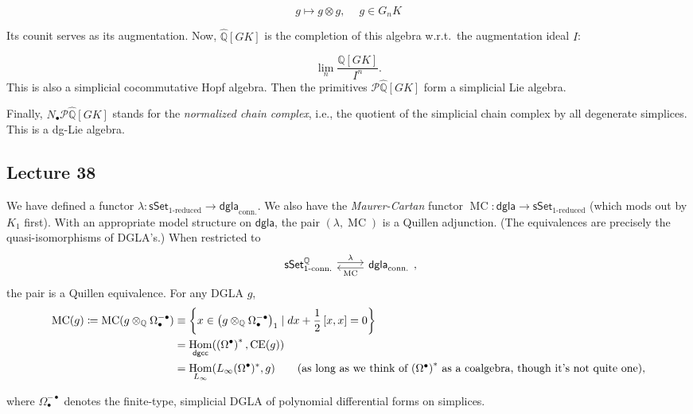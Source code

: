 \documentclass[10pt,letterpaper,cm]{nupset}
\theoremstyle{definition}
\theoremstyle{theorem}
\theoremstyle{remark}
\renewcommand{\P}{\mathcal P}
\newcommand{\Q}{\mathbb Q}
\newcommand{\1}{\mathbb{1}}
\newcommand{\0}{\vec 0}
\DeclareMathOperator{\Hom}{Hom}
\DeclareMathOperator{\mc}{MC}
\DeclareMathOperator{\ce}{CE}
\begin{document}
\[
g \mapsto g \otimes g, \ \quad g \in G_n{K}
\]

Its counit serves as its augmentation. Now, $\hat{\Q}\left[G{K}\right]$ is the completion of this algebra w.r.t.\ the augmentation ideal $I$:

\[
\lim_n\frac{\Q\left[G{K}\right]}{I^n}
.\] 
This is also a simplicial cocommutative Hopf algebra. Then the primitives $\P{\hat{\Q}\left[G{K}\right]}$ form a simplicial Lie algebra. 

\medskip

Finally,  $N_{\bullet}{\P{\hat{\Q}\left[G{K}\right]}}$ stands for the \textit{normalized chain complex}, i.e., the quotient of the simplicial chain complex by all degenerate simplices. This is a dg-Lie algebra. 

\subsection{Lecture 38}

We have defined a functor $\lambda : \mathsf{sSet}_{\text{$1$-reduced}} \to \mathsf{dgla}_{\text{conn.}}$. We also have the \textit{Maurer-Cartan} functor  \linebreak $\mc : \mathsf{dgla} \to \mathsf{sSet}_{\text{$1$-reduced}}$ (which mods out by $K_1$  first). With an appropriate model structure on $\mathsf{dgla}$, the pair $\left(\lambda, \mc\right)$ is a Quillen adjunction. (The equivalences are precisely the quasi-isomorphisms of DGLA's.) When restricted to 
\[
\begin{tikzcd}
	{\mathsf{sSet}_{\text{$1$-conn.}}^{\Q}} & {\mathsf{dgla}_{\text{conn.}}}
	\arrow["\lambda", shift left=1, from=1-1, to=1-2]
	\arrow["\mc", shift left=1, from=1-2, to=1-1]
\end{tikzcd}
,\]
the pair is a Quillen equivalence. For any DGLA $g$,
\begin{align*}
\mc(g) \coloneqq \mc(g \otimes_{\Q} \Omega_{\bullet}^{-{\bullet}}) & \equiv \left\{x \in \left(g \otimes_{\Q} \Omega_{\bullet}^{-{\bullet}}\right)_1 \mid d{x} + \frac{1}{2}\left[x,x\right] = 0 \right\}
\\ & =  \Hom_{\mathsf{dgcc}}(\left(\Omega^{\bullet}\right)^{\ast}, \ce(g))
\\ & = \Hom_{L_{\infty}}(L_{\infty}{(\Omega^{\bullet})^{\ast}}, g) \tag{as long as we think of $\left(\Omega^{\bullet}\right)^{\ast}$ as a coalgebra, though it's not quite one}
,\end{align*}

where $\Omega_{\bullet}^{-{\bullet}}$ denotes the finite-type, simplicial DGLA of polynomial differential forms on simplices.
\end{document}

